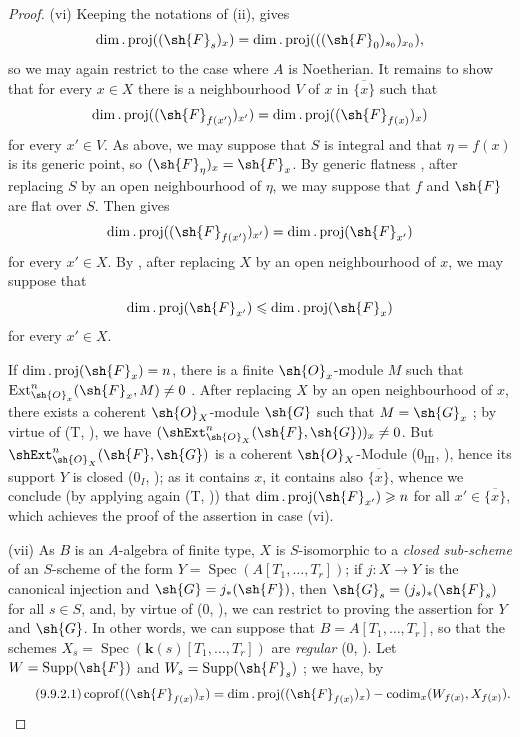\begin{proof}
(vi) Keeping the notations of (ii),  gives
\[
  \dim.\operatorname{proj}((\sh{F}_s)_x)
  =\dim.\operatorname{proj}(((\sh{F}_0)_{s_0})_{x_0}),
\]
so we may again restrict to the case where $A$ is Noetherian. It remains to show that for every $x\in X$ there is a neighbourhood $V$ of $x$ in $\overline{\{x\}}$ such that
\[
  \dim.\operatorname{proj}((\sh{F}_{f(x')})_{x'})
  =\dim.\operatorname{proj}((\sh{F}_{f(x)})_x)
\]
for every $x'\in V$. As above, we may suppose that $S$ is integral and that $\eta=f(x)$ is its generic point, so $(\sh{F}_\eta)_x=\sh{F}_x$. By generic flatness , after replacing $S$ by an open neighbourhood of $\eta$, we may suppose that $f$ and $\sh{F}$ are flat over $S$. Then  gives
\[
  \dim.\operatorname{proj}((\sh{F}_{f(x')})_{x'})
  =\dim.\operatorname{proj}(\sh{F}_{x'})
\]
for every $x'\in X$. By , after replacing $X$ by an open neighbourhood of $x$, we may suppose that
\[
  \dim.\operatorname{proj}(\sh{F}_{x'})
  \leqslant\dim.\operatorname{proj}(\sh{F}_x)
\]
for every $x'\in X$.

If $\dim.\operatorname{proj}(\sh{F}_x)=n$, there is a finite $\sh{O}_x$-module $M$ such that $\operatorname{Ext}^n_{\sh{O}_x}(\sh{F}_x,M)\neq 0$ .
After replacing $X$ by an open neighbourhood of $x$, there exists a coherent $\sh{O}_X$-module $\sh{G}$ such that $M=\sh{G}_x$ ;
by virtue of (T, ), we have $(\shExt^n_{\sh{O}_X}(\sh{F},\sh{G}))_x\neq 0$.
But $\shExt^n_{\sh{O}_X}(\sh{F},\sh{G})$ is a coherent $\sh{O}_X$-Module ($0_{\mathrm{III}}$, ), hence its support $Y$ is closed ($0_I$, ); as it contains $x$, it contains also $\overline{\{x\}}$, whence we conclude (by applying again (T, )) that $\dim.\operatorname{proj}(\sh{F}_{x'})\geqslant n$ for all $x'\in\overline{\{x\}}$, which achieves the proof of the assertion in case (vi).

(vii) As $B$ is an $A$-algebra of finite type, $X$ is $S$-isomorphic to a \emph{closed sub-scheme} of an $S$-scheme of the form $Y=\operatorname{Spec}(A[T_1,\ldots,T_r])$; if $j:X\to Y$ is the canonical injection and $\sh{G}=j_*(\sh{F})$, then $\sh{G}_s=(j_s)_*(\sh{F}_s)$ for all $s\in S$, and, by virtue of ($0$, ), we can restrict to proving the assertion for $Y$ and $\sh{G}$.
In other words, we can suppose that $B=A[T_1,\ldots,T_r]$, so that the schemes $X_s=\operatorname{Spec}(\mathbf{k}(s)[T_1,\ldots,T_r])$ are \emph{regular} ($0$, ).
Let $W=\operatorname{Supp}(\sh{F})$ and $W_s=\operatorname{Supp}(\sh{F}_s)$ ; we have, by 
\begin{equation}
\tag{9.9.2.1}
\label{IV.9.9.2.1}
  \operatorname{coprof}((\sh{F}_{f(x)})_x)=\dim.\operatorname{proj}((\sh{F}_{f(x)})_x)-\operatorname{codim}_x(W_{f(x)},X_{f(x)}).
\end{equation}


\end{proof}
